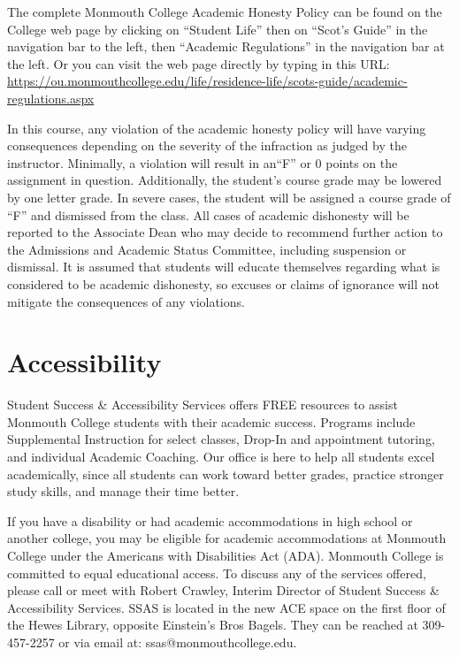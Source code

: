 \documentclass[10pt]{article}
\begin{document}
The complete Monmouth College Academic Honesty Policy can be found on the College web page by clicking on ``Student Life'' then on ``Scot’s Guide'' in the navigation bar to the left, then ``Academic Regulations'' in the navigation bar at the left.  Or you can visit the web page directly by typing in this URL: \url{https://ou.monmouthcollege.edu/life/residence-life/scots-guide/academic-regulations.aspx}

In this course, any violation of the academic honesty policy will have varying consequences depending on the severity of the infraction as judged by the instructor. Minimally, a violation will result in an``F'' or 0 points on the assignment in question. Additionally, the student’s course grade may be lowered by one letter grade. In severe cases, the student will be assigned a course grade of ``F'' and dismissed from the class. All cases of academic dishonesty will be reported to the Associate Dean who may decide to recommend further action to the Admissions and Academic Status Committee, including suspension or dismissal. It is assumed that students will educate themselves regarding what is considered to be academic dishonesty, so excuses or claims of ignorance will not mitigate the consequences of any violations.

\section{Accessibility}

Student Success \& Accessibility Services offers FREE resources to assist Monmouth College students with their academic success. Programs include Supplemental Instruction for select classes, Drop-In and appointment tutoring, and individual Academic Coaching. Our office is here to help all students excel academically, since all students can work toward better grades, practice stronger study skills, and manage their time better.

If you have a disability or had academic accommodations in high school or another college, you may be eligible for academic accommodations at Monmouth College under the Americans with Disabilities Act (ADA). Monmouth College is committed to equal educational access. To discuss any of the services offered, please call or meet with Robert Crawley, Interim Director of Student Success \& Accessibility Services.  SSAS is located in the new ACE space on the first floor of the Hewes Library, opposite Einstein’s Bros Bagels. They can be reached at 309-457-2257 or via email at: ssas@monmouthcollege.edu.
\end{document}
